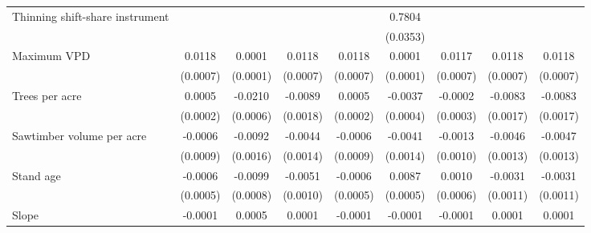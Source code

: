 \begin{tabular}{lcccccccc}
\addlinespace
Thinning shift-share instrument&                     &                     &                     &                     &      0.7804\sym{***}&                     &                     &                     \\
                    &                     &                     &                     &                     &    (0.0353)         &                     &                     &                     \\
\addlinespace
Maximum VPD         &      0.0118\sym{***}&      0.0001         &      0.0118\sym{***}&      0.0118\sym{***}&      0.0001         &      0.0117\sym{***}&      0.0118\sym{***}&      0.0118\sym{***}\\
                    &    (0.0007)         &    (0.0001)         &    (0.0007)         &    (0.0007)         &    (0.0001)         &    (0.0007)         &    (0.0007)         &    (0.0007)         \\
\addlinespace
Trees per acre      &      0.0005\sym{**} &     -0.0210\sym{***}&     -0.0089\sym{***}&      0.0005\sym{**} &     -0.0037\sym{***}&     -0.0002         &     -0.0083\sym{***}&     -0.0083\sym{***}\\
                    &    (0.0002)         &    (0.0006)         &    (0.0018)         &    (0.0002)         &    (0.0004)         &    (0.0003)         &    (0.0017)         &    (0.0017)         \\
\addlinespace
Sawtimber volume per acre&     -0.0006         &     -0.0092\sym{***}&     -0.0044\sym{***}&     -0.0006         &     -0.0041\sym{***}&     -0.0013         &     -0.0046\sym{***}&     -0.0047\sym{***}\\
                    &    (0.0009)         &    (0.0016)         &    (0.0014)         &    (0.0009)         &    (0.0014)         &    (0.0010)         &    (0.0013)         &    (0.0013)         \\
\addlinespace
Stand age           &     -0.0006         &     -0.0099\sym{***}&     -0.0051\sym{***}&     -0.0006         &      0.0087\sym{***}&      0.0010         &     -0.0031\sym{***}&     -0.0031\sym{***}\\
                    &    (0.0005)         &    (0.0008)         &    (0.0010)         &    (0.0005)         &    (0.0005)         &    (0.0006)         &    (0.0011)         &    (0.0011)         \\
\addlinespace
Slope               &     -0.0001         &      0.0005\sym{***}&      0.0001         &     -0.0001         &     -0.0001         &     -0.0001         &      0.0001         &      0.0001         \\

\end{tabular}
